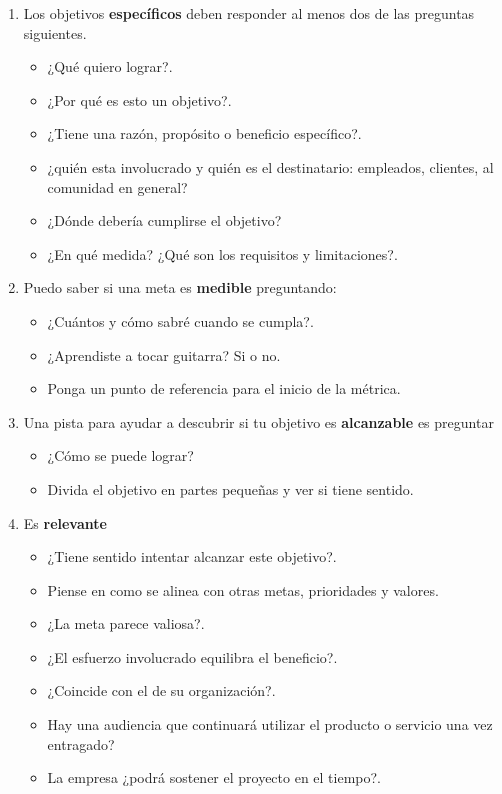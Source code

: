 \documentclass[10pt]{book}
\begin{document}
    \begin{enumerate}[\bfseries 1.]

	\item Los objetivos \textbf{específicos} deben responder al menos dos de las preguntas siguientes.
	\begin{itemize}
	    \item ¿Qué quiero lograr?.
	    \item ¿Por qué es esto un objetivo?.
	    \item ¿Tiene una razón, propósito o beneficio específico?.
	    \item ¿quién esta involucrado y quién es el destinatario: empleados, clientes, al comunidad en general?
	    \item ¿Dónde debería cumplirse el objetivo?
	    \item ¿En qué medida? ¿Qué son los requisitos y limitaciones?.\\
	\end{itemize}
	
	\item Puedo saber si una meta es \textbf{medible} preguntando:
	\begin{itemize}
	    \item ¿Cuántos y cómo sabré cuando se cumpla?.
	    \item ¿Aprendiste a tocar guitarra? Si o no.
	    \item Ponga un punto de referencia para el inicio de la métrica.\\
	\end{itemize}
	
	\item Una pista para ayudar a descubrir si tu objetivo es \textbf{alcanzable} es preguntar
	    \begin{itemize}
		\item ¿Cómo se puede lograr?
		\item Divida el objetivo en partes pequeñas y ver si tiene sentido.
	    \end{itemize}

	\item Es \textbf{relevante}
	    \begin{itemize}
		\item ¿Tiene sentido intentar alcanzar este objetivo?.
		\item Piense en como se alinea con otras metas, prioridades y valores.
		\item ¿La meta parece valiosa?.
		\item ¿El esfuerzo involucrado equilibra el beneficio?.
		\item ¿Coincide con el de su organización?.
		\item Hay una audiencia que continuará utilizar el producto o servicio una vez entragado?
		\item La empresa ¿podrá sostener el proyecto en el tiempo?.
	    \end{itemize}


\end{enumerate}
\end{document}
